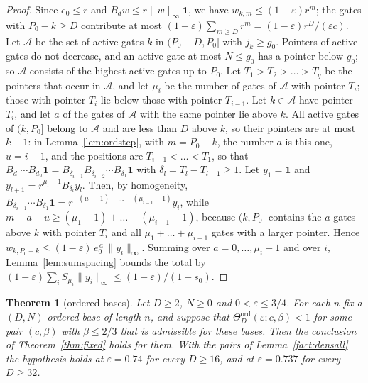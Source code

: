 \documentclass[11pt]{amsart}
\newtheorem{theorem}{Theorem}
\theoremstyle{definition}
\theoremstyle{remark}
\newcommand{\eps}{\varepsilon}
\begin{document}
\begin{proof}
Since $e_0\le r$ and $B_dw\le r\|w\|_\infty\mathbf 1$, we have $w_{k,m}\le(1-\eps)r^m$; the gates
with $P_0-k\ge D$ contribute at most $(1-\eps)\sum_{m\ge D}r^m=(1-\eps)r^D/(\eps c)$. Let $\mathcal A$
be the set of active gates $k$ in $(P_0-D,P_0]$ with $j_k\ge g_0$. Pointers of active gates do not
decrease, and an active gate at most $N\le g_0$ has a pointer below $g_0$; so $\mathcal A$
consists of the highest active gates up to $P_0$. Let $T_1>T_2>\dots>T_q$ be the pointers that
occur in $\mathcal A$, and let $\mu_i$ be the number of gates of $\mathcal A$ with pointer $T_i$;
those with pointer $T_i$ lie below those with pointer $T_{i-1}$. Let $k\in\mathcal A$ have pointer
$T_i$, and let $a$ of the gates of $\mathcal A$ with the same pointer lie above $k$. All active
gates of $(k,P_0]$ belong to $\mathcal A$ and are less than $D$ above $k$, so their pointers are
at most $k-1$: in Lemma~\ref{lem:ordstep}, with $m=P_0-k$, the number $a$ is this one, $u=i-1$,
and the positions are $T_{i-1}<\dots<T_1$, so that
$B_{d_1}\cdots B_{d_u}\mathbf 1=B_{\delta_{i-1}}B_{\delta_{i-2}}\cdots B_{\delta_1}\mathbf 1$ with
$\delta_l=T_l-T_{l+1}\ge1$. Let $y_1=\mathbf 1$ and $y_{l+1}=r^{\mu_l-1}B_{\delta_l}y_l$. Then, by homogeneity,
$B_{\delta_{i-1}}\cdots B_{\delta_1}\mathbf 1=r^{-(\mu_1-1)-\dots-(\mu_{i-1}-1)}y_i$, while
$m-a-u\ge(\mu_1-1)+\dots+(\mu_{i-1}-1)$, because $(k,P_0]$ contains the $a$ gates above $k$ with
pointer $T_i$ and all $\mu_1+\dots+\mu_{i-1}$ gates with a larger pointer. Hence
$w_{k,P_0-k}\le(1-\eps)\,e_0^{\,a}\,\|y_i\|_\infty$. Summing over $a=0,\dots,\mu_i-1$ and over $i$,
Lemma~\ref{lem:sumspacing} bounds the total by $(1-\eps)\sum_iS_{\mu_i}\|y_i\|_\infty\le(1-\eps)/(1-s_0)$.
\end{proof}

\begin{theorem}[ordered bases]\label{thm:ordered}
Let $D\ge2$, $N\ge0$ and $0<\eps\le3/4$. For each $n$ fix a $(D,N)$-ordered base of length $n$, and
suppose that $\Theta^{\mathrm{ord}}_D(\eps;c,\beta)<1$ for some pair $(c,\beta)$ with
$\beta\le2/3$ that is admissible for these bases. Then the conclusion of
Theorem~\ref{thm:fixed} holds for them. With the pairs of Lemma~\ref{fact:densall} the hypothesis
holds at $\eps=0.74$ for every $D\ge16$, and at $\eps=0.737$ for every $D\ge32$.
\end{theorem}
\end{document}
